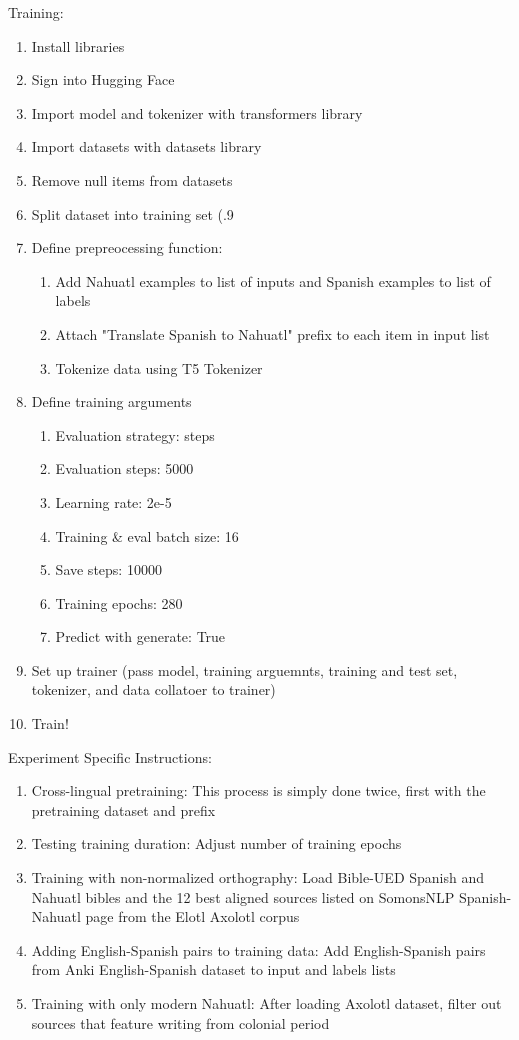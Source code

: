 \documentclass[10pt,twocolumn]{article}
\begin{document}
Training:
\begin{enumerate}
    \item Install libraries
    \item Sign into Hugging Face
    \item Import model and tokenizer with transformers library
    \item Import datasets with datasets library
    \item Remove null items from datasets
    \item Split dataset into training set (.9%
    \item Define prepreocessing function:
        \begin{enumerate}
        \item Add Nahuatl examples to list of inputs and Spanish examples to list of labels
        \item Attach "Translate Spanish to Nahuatl" prefix to each item in input list
        \item Tokenize data using T5 Tokenizer
        \end{enumerate}
\item Define training arguments
\begin{enumerate}
    \item Evaluation strategy: steps
    \item Evaluation steps: 5000
    \item Learning rate: 2e-5
    \item Training & eval batch size: 16
    \item Save steps: 10000
    \item Training epochs: 280
    \item Predict with generate: True
    \end{enumerate}
\item Set up trainer (pass model, training arguemnts, training and test set, tokenizer, and data collatoer to trainer)
\item Train! \\
\end{enumerate}

Experiment Specific Instructions:
\begin{enumerate}
\item Cross-lingual pretraining: This process is simply done twice, first with the pretraining dataset and prefix
\item Testing training duration: Adjust number of training epochs
\item Training with non-normalized orthography: Load Bible-UED Spanish and Nahuatl bibles and the 12 best aligned sources listed on SomonsNLP Spanish-Nahuatl page from the Elotl Axolotl corpus 
\item Adding English-Spanish pairs to training data: Add English-Spanish pairs from Anki English-Spanish dataset to input and labels lists
\item Training with only modern Nahuatl: After loading Axolotl dataset, filter out sources that feature writing from colonial period
\end{enumerate}
\end{document}
